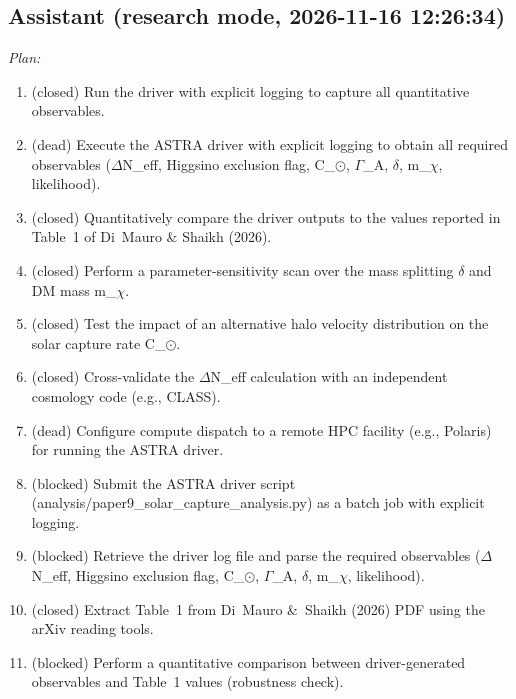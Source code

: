 \documentclass[11pt,a4paper]{article}
\begin{document}
\subsection*{Assistant \small(research mode, 2026-11-16 12:26:34)}
\textit{Plan:}\begin{enumerate}
  \item (closed) Run the driver with explicit logging to capture all quantitative observables.
  \item (dead) Execute the ASTRA driver with explicit logging to obtain all required observables ($\Delta$N\_eff, Higgsino exclusion flag, C\_$\odot$, $\Gamma$\_A, $\delta$, m\_$\chi$, likelihood).
  \item (closed) Quantitatively compare the driver outputs to the values reported in Table~1 of Di~Mauro \& Shaikh (2026).
  \item (closed) Perform a parameter-sensitivity scan over the mass splitting $\delta$ and DM mass m\_$\chi$.
  \item (closed) Test the impact of an alternative halo velocity distribution on the solar capture rate C\_$\odot$.
  \item (closed) Cross-validate the $\Delta$N\_eff calculation with an independent cosmology code (e.g., CLASS).
  \item (dead) Configure compute dispatch to a remote HPC facility (e.g., Polaris) for running the ASTRA driver.
  \item (blocked) Submit the ASTRA driver script (analysis/paper9\_solar\_capture\_analysis.py) as a batch job with explicit logging.
  \item (blocked) Retrieve the driver log file and parse the required observables ($\Delta$N\_eff, Higgsino exclusion flag, C\_$\odot$, $\Gamma$\_A, $\delta$, m\_$\chi$, likelihood).
  \item (closed) Extract Table~1 from Di~Mauro \&~Shaikh (2026) PDF using the arXiv reading tools.
  \item (blocked) Perform a quantitative comparison between driver-generated observables and Table~1 values (robustness check).
\end{enumerate}
\end{document}
